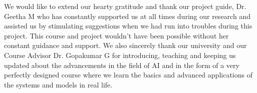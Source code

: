 

\begin{acknowledgements}      %
	We would like to extend our hearty gratitude and thank our project guide, Dr. Geetha M who has constantly supported us at all times during our research and assisted us by stimulating suggestions when we had run into troubles during this project. This course and project wouldn’t have been possible without her constant guidance and support. We also sincerely thank our university and our Course Advisor Dr. Gopakumar G for introducing, teaching and keeping us updated about the advancements in the field of AI and in the form of a very perfectly designed course where we learn the basics and advanced applications of the systems and models in real life.

\end{acknowledgements}













